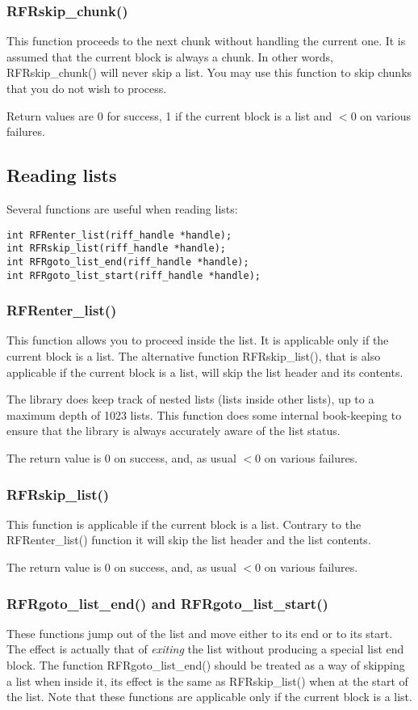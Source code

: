 \documentclass[12pt, a4paper]{article}
\begin{document}
\subsubsection{RFRskip\_chunk()}
This function proceeds to the next chunk without handling the current one.
It is assumed that the current block is always a chunk. In other words,
RFRskip\_chunk() will never skip a list. You may use this function to
skip chunks that you do not wish to process.

Return values are 0 for success, 1 if the current block is a list and $<0$
on various failures.

\subsection{Reading lists}
Several functions are useful when reading lists:
\begin{verbatim}
int RFRenter_list(riff_handle *handle);
int RFRskip_list(riff_handle *handle);
int RFRgoto_list_end(riff_handle *handle);
int RFRgoto_list_start(riff_handle *handle);
\end{verbatim}

\subsubsection{RFRenter\_list()}
This function allows you to proceed inside the list. It is applicable
only if the current block is a list. The alternative
function RFRskip\_list(), that is also applicable if the current block
is a list, will skip the list header and its contents.

The library does keep track of nested lists (lists inside other lists),
up to a maximum depth of 1023 lists. This function does some internal
book-keeping to ensure that the library is always accurately aware of
the list status. 

The return value is 0 on success, and, as usual $<0$ on various failures.

\subsubsection{RFRskip\_list()}
This function is applicable if the current block is a list. Contrary to
the RFRenter\_list() function it will skip the list header and the list
contents.   

The return value is 0 on success, and, as usual $<0$ on various failures.

\subsubsection{RFRgoto\_list\_end() and RFRgoto\_list\_start()}
These functions jump out of the list and move either to its end or to its
start. The effect is actually that of \emph{exiting} the list without 
producing a special list end block. The function RFRgoto\_list\_end()
should be treated as a way of skipping a list when inside it, its effect
is the same as RFRskip\_list() when at the start of the list. Note that
these functions are applicable only if the current block is a list.
\end{document}
